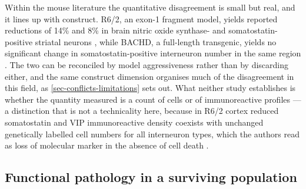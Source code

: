 \documentclass[11pt]{article}
\begin{document}
Within the mouse literature the quantitative disagreement is small but real, and it lines up with construct. R6/2, an exon-1 fragment model, yields reported reductions of 14\% and 8\% in brain nitric oxide synthase- and somatostatin-positive striatal neurons \citep{Rajput2011}, while BACHD, a full-length transgenic, yields no significant change in somatostatin-positive interneuron number in the same region \citep{Rallapalle2021}. The two can be reconciled by model aggressiveness rather than by discarding either, and the same construct dimension organises much of the disagreement in this field, as \ref{sec-conflicts-limitations} sets out. What neither study establishes is whether the quantity measured is a count of cells or of immunoreactive profiles --- a distinction that is not a technicality here, because in R6/2 cortex reduced somatostatin and VIP immunoreactive density coexists with unchanged genetically labelled cell numbers for all interneuron types, which the authors read as loss of molecular marker in the absence of cell death \citep{Voelkl2022}.

\subsection{Functional pathology in a surviving population}
\label{sec-06-functional-pathology}
\end{document}
